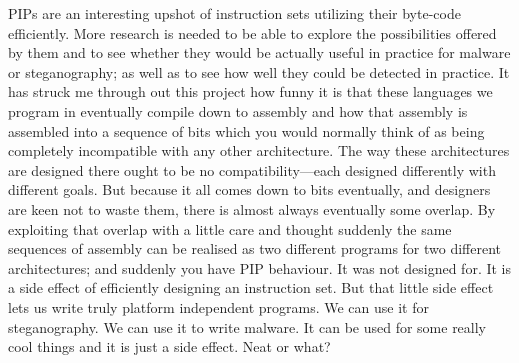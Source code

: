 \documentclass[10pt]{book}
\begin{document}
PIPs are an interesting upshot of instruction sets utilizing their
byte-code efficiently. More research is needed to be able to explore the
possibilities offered by them and to see whether they would be actually
useful in practice for malware or steganography; as well as to see how
well they could be detected in practice. It has struck me through out
this project how funny it is that these languages we program in
eventually compile down to assembly and how that assembly is assembled
into a sequence of bits which you would normally think of as being
completely incompatible with any other architecture. The way these
architectures are designed there ought to be no compatibility---each
designed differently with different goals. But because it all comes down
to bits eventually, and designers are keen not to waste them, there is
almost always eventually some overlap. By exploiting that overlap with a
little care and thought suddenly the same sequences of assembly can be
realised as two different programs for two different architectures; and
suddenly you have PIP behaviour. It was not designed for. It is a side
effect of efficiently designing an instruction set. But that little side
effect lets us write truly platform independent programs. We can use it
for steganography. We can use it to write malware. It can be used for
some really cool things and it is just a side effect. Neat or what?

\appendix

\printbibliography[title=Bibliography]
\end{document}
